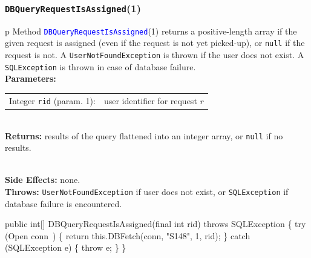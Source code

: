 \documentclass{article}
\def\nwendcode{\endtrivlist \endgroup}      %
\let\nwdocspar=\par
\theoremstyle{definition}                   %
\begin{document}
\subsubsection{{\tt{}\protect{}DBQueryRequestIsAssigned}(1)}
\begin{tabular}{p{\textwidth}}
\toprule
{}
Method \textcolor{blue}{{\tt{}\protect{}DBQueryRequestIsAssigned}}(1) returns a
positive-length array if the given request is assigned (even if the request is
not yet picked-up), or {\tt{}null} if the request is not.  A
{\tt{}UserNotFoundException} is thrown if the user does not exist.
A {\tt{}SQLException} is thrown in case of database failure.\\
\midrule
\textbf{Parameters:} \\
\begin{tabular}{lp{116mm}}
Integer {\tt{}rid} (param. 1):&user identifier for request $r$
\end{tabular}\\
\textbf{Returns:} results of the query flattened into an integer array, or
{\tt{}null} if no results.

\\
\textbf{Side Effects:} none.\\
\textbf{Throws:} {\tt{}UserNotFoundException} if user does not exist, or
{\tt{}SQLException} if database failure is encountered.\\
\bottomrule
\end{tabular}
\nwenddocs{}\endmoddef{}
public int[] DBQueryRequestIsAssigned(final int rid) throws SQLException \{
  try (\LA{}Open \code{}conn\edoc{}~{\nwtagstyle{}}\RA{}) \{
    return this.DBFetch(conn, "S148", 1, rid);
  \} catch (SQLException e) \{
    throw e;
  \}
\}
\eatline
{}\nwendcode{}\nwdocspar
\end{document}
